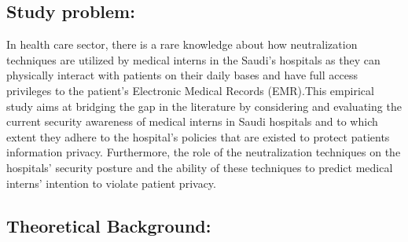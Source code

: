  \subsection{Study problem:}
In health care sector, there is a rare knowledge about how neutralization techniques are utilized by medical interns in the Saudi's hospitals as they can physically interact with patients on their daily bases and have full access privileges to the patient's Electronic Medical Records (EMR).This empirical study aims at bridging the gap in the literature by considering and evaluating the current security awareness of medical interns in Saudi hospitals and to which extent they adhere to the hospital's policies that are existed to protect patients information privacy. Furthermore, the role of the neutralization techniques on the hospitals' security posture and the ability of these techniques to predict medical interns' intention to violate patient privacy.
\subsection{Theoretical Background:}
